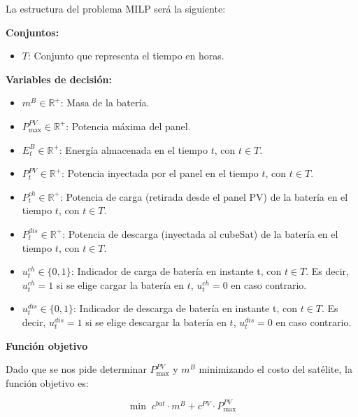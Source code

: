 La estructura del problema MILP será la siguiente:

\textbf{Conjuntos:}
\begin{itemize}
    \item $T$: Conjunto que representa el tiempo en horas.
\end{itemize}

\textbf{Variables de decisión:}
\begin{itemize}
    \item $m^B \in \mathbb{R}^{+}$: Masa de la batería.

    \item $P^{PV}_{\max} \in \mathbb{R}^{+}$: Potencia máxima del panel.

    \item $E_t^B \in \mathbb{R}^{+}$: Energía almacenada en el tiempo $t$, con $t \in T$.

    \item $P_t^{PV} \in \mathbb{R}^{+}$: Potencia inyectada por el panel en el tiempo $t$, con $t \in T$.

    \item $P_t^{ch} \in \mathbb{R}^{+}$: Potencia de carga (retirada desde el panel PV) de la batería en el tiempo $t$, con $t \in T$.

    \item $P_t^{dis} \in \mathbb{R}^{+}$: Potencia de descarga (inyectada al cubeSat) de la batería en el tiempo $t$, con $t \in T$.

    \item $u_t^{ch} \in \{0,1\}$: Indicador de carga de batería en instante t, con $t \in T$. Es decir, $u_t^{ch}=1$ si se elige cargar la batería en $t$, $u_t^{ch}=0$ en caso contrario.

    \item $u_t^{dis} \in \{0,1\}$: Indicador de descarga de batería en instante t, con $t \in T$. Es decir, $u_t^{dis}=1$ si se elige descargar la batería en $t$, $u_t^{dis}=0$ en caso contrario.
\end{itemize}

\textbf{Función objetivo}

Dado que se nos pide determinar $P^{PV}_{\max}$ y $m^B$ minimizando el costo del satélite, la función objetivo es:

\[
\min \; c^{bat}\cdot m^B + c^{PV}\cdot P^{PV}_{\max}
\]

